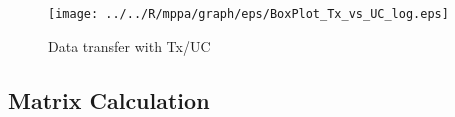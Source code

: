 \documentclass[conference,compsoc]{IEEEtran}
\begin{document}
\begin{figure}[t]
  \centering
  \texttt{[image: ../../R/mppa/graph/eps/BoxPlot\_Tx\_vs\_UC\_log.eps]}
  \caption{\label{fig:tx_uc_log}
    Data transfer with Tx/UC }
\end{figure}


\subsection{Matrix Calculation}
\label{sec:martix_eval}
\end{document}
